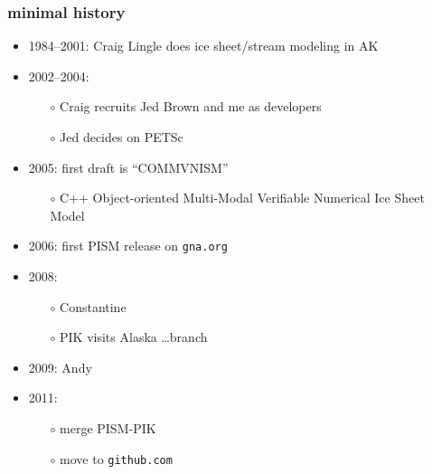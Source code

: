 \documentclass[hide notes,intlimits]{beamer}
\begin{document}
\begin{frame}
  \frametitle{minimal history}
  \begin{itemize}
  \item 1984--2001: Craig Lingle does ice sheet/stream modeling in AK
  \item 2002--2004:
    \begin{itemize}
    \item[$\circ$] Craig recruits Jed Brown and me as developers
    \item[$\circ$] Jed decides on PETSc
    \end{itemize}
  \item 2005: first draft is ``COMMVNISM''
    \begin{itemize}
    \scriptsize
    \item[$\circ$] \alert{C++ Object-oriented Multi-Modal Verifiable Numerical Ice Sheet Model}
    \normalsize
    \end{itemize}
  \item 2006: first PISM release on \texttt{gna.org}
  \item 2008:
    \begin{itemize}
    \item[$\circ$] Constantine
    \item[$\circ$] PIK visits Alaska \dots branch
    \end{itemize}
  \item 2009: Andy
  \item 2011:
    \begin{itemize}
    \item[$\circ$] merge PISM-PIK
    \item[$\circ$] move to \texttt{github.com}
    \end{itemize}
  \end{itemize}
\end{frame}
\end{document}
